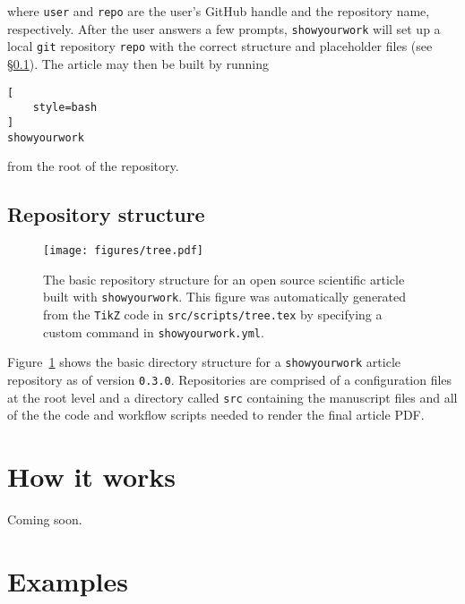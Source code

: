 \documentclass[modern]{aastex631}
\newcommand\syw{\texttt{showyourwork}\xspace}
\begin{document}
\noindent where \texttt{\color{lsthilite}user} and \texttt{\color{lsthilite}repo} are the user's GitHub handle and the repository name, respectively. 
After the user answers a few prompts, \syw will set up a local \texttt{git} repository \texttt{\color{lsthilite}repo} with the correct structure and placeholder files (see \S\ref{sec:usage:struct}).
The article may then be built by running\\

\noindent\begin{minipage}{\linewidth}
\begin{lstlisting}[
    style=bash
]
showyourwork
\end{lstlisting}
\end{minipage}

\noindent from the root of the repository.

\subsection{Repository structure}
\label{sec:usage:struct}
%
\begin{figure}[p!]
    \begin{centering}
        \texttt{[image: figures/tree.pdf]}
        \caption{
            The basic repository structure for an open source scientific article built with \syw.
            This figure was automatically generated from the \texttt{TikZ} code in \texttt{src/scripts/tree.tex} by specifying a custom command in \texttt{showyourwork.yml}.
        }
        \label{fig:tree}
    \end{centering}
\end{figure}
%
Figure~\ref{fig:tree} shows the basic directory structure for a \syw article repository as of version \texttt{0.3.0}.
Repositories are comprised of a configuration files at the root level and a directory called \texttt{src} containing the manuscript files and all of the the code and workflow scripts needed to render the final article PDF.

\section{How it works}
\label{sec:how-it-works}
Coming soon.

\section{Examples}
\label{sec:examples}
\end{document}
